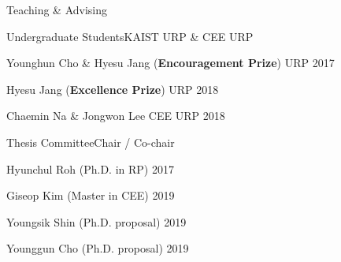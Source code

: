 \begin{rSection}{Teaching \& Advising}
\newpage
\begin{rSubsection}{Undergraduate Students}{}{KAIST \acf{URP} \& CEE URP}{}
  \item Younghun Cho \& Hyesu Jang ({\bf Encouragement Prize}) \hfill URP 2017
  \item Hyesu Jang ({\bf Excellence Prize}) \hfill URP 2018
  \item Chaemin Na \& Jongwon Lee \hfill CEE URP 2018
\end{rSubsection}

\begin{rSubsection}{Thesis Committee}{}{Chair / Co-chair }{}
  \item Hyunchul Roh (Ph.D. in \ac{RP}) \hfill 2017
  \item Giseop Kim (Master in \ac{CEE}) \hfill 2019
  \item Youngsik Shin (Ph.D. proposal) \hfill 2019
  \item Younggun Cho (Ph.D. proposal) \hfill 2019
\end{rSubsection}

\end{rSection}
